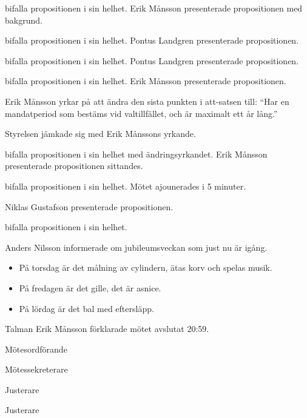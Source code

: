 \documentclass[10pt]{article}
\def\mo{Erik Månsson}
\def\ms{Axel Voss}
\def\ji{xxx}
\def\jii{xxx}
\begin{document}
\begin{paragrafer}
\begin{paragrafer}
            \Mba bifalla propositionen i sin helhet.
            Erik Månsson presenterade propositionen med bakgrund.

            \Mba bifalla propositionen i sin helhet.
            Pontus Landgren presenterade propositionen.

            \Mba bifalla propositionen i sin helhet.
            Pontus Landgren presenterade propositionen.

            \Mba bifalla propositionen i sin helhet.
            Erik Månsson presenterade propositionen.

            Erik Månsson yrkar på att ändra den sista punkten i att-satsen till:
            ``Har en mandatperiod som bestäms vid valtillfället, och är maximalt ett år lång.''

            Styrelsen jämkade sig med Erik Månssons yrkande.

            \Mba bifalla propositionen i sin helhet med ändringsyrkandet.
            Erik Månsson presenterade propositionen sittandes.

            \Mba bifalla propositionen i sin helhet.
            Mötet ajounerades i 5 minuter.

            Niklas Gustafson presenterade propositionen.

            \Mba bifalla propositionen i sin helhet.
        \end{paragrafer}

Anders Nilsson informerade om jubileumsveckan som just nu är igång.
\begin{itemize}
  \item På torsdag är det målning av cylindern, ätas korv och spelas musik.
  \item På fredagen är det gille, det är asnice.
  \item På lördag är det bal med eftersläpp.
\end{itemize}

Talman {\mo} förklarade mötet avslutat 20:59.

\end{paragrafer}

\hidesignfoot
\begin{signatures}{4}
\signature{\mo}{Mötesordförande}
\signature{\ms}{Mötessekreterare}
\signature{\ji}{Justerare}
\signature{\jii}{Justerare}
\end{signatures}
\end{document}
